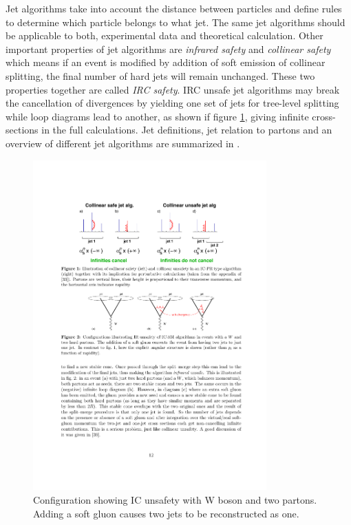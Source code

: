 Jet algorithms take into account the distance between particles and define rules to determine which particle belongs to what jet. The same jet algorithms should be applicable to both, experimental data and theoretical calculation.  Other important properties of jet algorithms are \textit{infrared safety} and \textit{collinear safety} which means if an event is modified by addition of soft emission of collinear splitting, the final number of hard jets will remain unchanged. These two properties together are called \textit{IRC safety}. IRC unsafe jet algorithms may break the cancellation of divergences by yielding one set of jets for tree-level splitting while loop diagrams lead to another, as shown if figure \ref{fig:jet_unsafe}, giving infinite cross-sections in the full calculations. Jet definitions, jet relation to partons and an overview of different jet algorithms are summarized in \cite{Salam:2009jx}.
\begin{figure}[htbp]
	\centering
		\includegraphics[width=0.8\textwidth]{Figures/jet_unsafe2.pdf}
	\caption[An example of configuration of IRC unsafe jet algorithm.]{Configuration showing IC  unsafety with W boson and two partons. Adding a soft gluon causes two jets to be reconstructed as one. \cite{Salam:2009jx}}
	\label{fig:jet_unsafe}
\end{figure}

